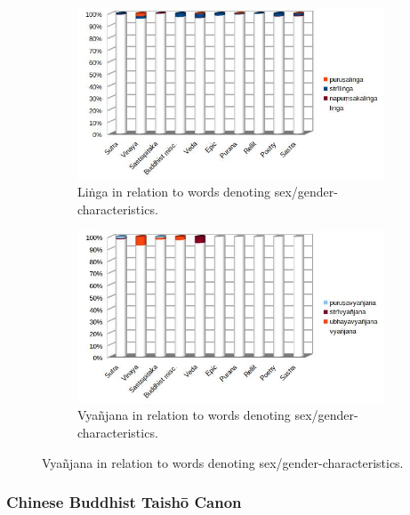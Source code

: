 \begin{figure}[!h]
  \begin{subfigure}{0.497\linewidth}
    \includegraphics[width=\linewidth]{sanskrit_linga.jpg}
    \caption{Liṅga in relation to words denoting sex/gender-characteristics.}
  \end{subfigure}
  \hfill
  \begin{subfigure}{0.503\linewidth}
    \includegraphics[width=\linewidth]{sanskrit_byanyana.jpg}
    \caption{Vyañjana in relation to words denoting sex/gender-characteristics.}
  \end{subfigure}
\setcounter{figure}{15}
\label{stri3}
\end{figure}


\newpage
\subsubsection*{Chinese Buddhist Taishō Canon}

